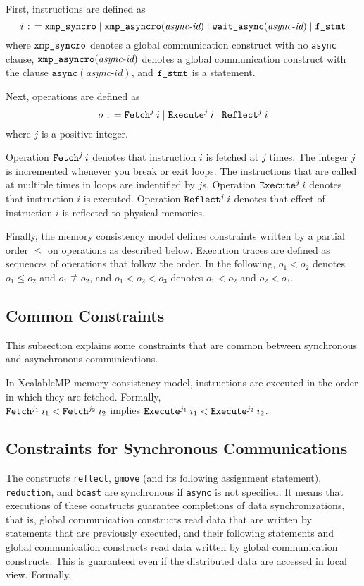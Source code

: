 First, instructions are defined as
\[
i \mathrel{\colon\!=} \texttt{xmp\_syncro} \mid \texttt{xmp\_asyncro}(\textit{async-id}) \mid \texttt{wait\_async}(\textit{async-id}) \mid \texttt{f\_stmt}
\]
where $\texttt{xmp\_syncro}$ denotes a global communication construct with no
\texttt{async} clause, $\texttt{xmp\_asyncro}(\textit{async-id})$ denotes a global
communication construct with the clause
$\texttt{async}(\textit{async-id})$,
and $\texttt{f\_stmt}$ is a statement.

Next, operations are defined as
\[
o \mathrel{\colon\!=} \texttt{Fetch}^{j} \: {i} \mid \texttt{Execute}^{j} \: {i} \mid \texttt{Reflect}^{j} \: {i}
\]
where $j$ is a positive integer.

Operation $\texttt{Fetch}^{j} \: {i}$ denotes that instruction $i$ is fetched at $j$
times.  The integer $j$ is incremented whenever you break or exit
loops.  The instructions that are called at multiple times in loops
are indentified by $j$s.  Operation $\texttt{Execute}^{j} \: {i}$ denotes that
instruction $i$ is executed.  Operation $\texttt{Reflect}^{j} \: {i}$ denotes that effect
of instruction $i$ is reflected to physical memories.

Finally, the memory consistency model defines constraints written by a
partial order $\leq$ on operations as described below.  Execution
traces are defined as sequences of operations that follow the order.
In the following, $o_1 < o_2$ denotes $o_1 \leq o_2$ and $o_1
\not\equiv o_2$, and $o_1 < o_2 < o_3$ denotes $o_1 < o_2$ and $o_2 <
o_3$.

\subsection{Common Constraints}

This subsection explains some constraints that are common between
synchronous and asynchronous communications.

In XcalableMP memory consistency model, instructions are executed in
the order in which they are fetched.  Formally,\\

\noindent
$\texttt{Fetch}^{j_1} \: {i_1} < \texttt{Fetch}^{j_2} \: {i_2}$ implies $\texttt{Execute}^{j_1} \: {i_1} < \texttt{Execute}^{j_2} \: {i_2}$.

\subsection{Constraints for Synchronous Communications}

The constructs \texttt{reflect}, \texttt{gmove} (and its following
assignment statement), \texttt{reduction}, and \texttt{bcast} are
synchronous if \texttt{async} is not specified.  It means that
executions of these constructs guarantee completions of data
synchronizations, that is, global communication constructs read data
that are written by statements that are previously executed, and their
following statements and global communication constructs read data
written by global communication constructs.  This is guaranteed even
if the distributed data are accessed in local view.  Formally,\\

